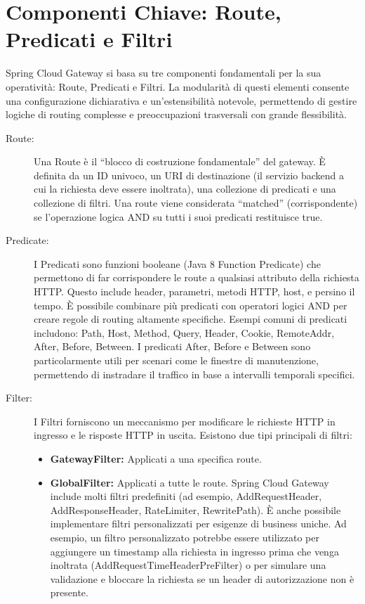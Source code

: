 \section{Componenti Chiave: Route, Predicati e Filtri}

Spring Cloud Gateway si basa su tre componenti fondamentali per la sua operatività: Route, Predicati e Filtri. La modularità di questi elementi consente una configurazione dichiarativa e un'estensibilità notevole, permettendo di gestire logiche di routing complesse e preoccupazioni trasversali con grande flessibilità.
\begin{description}
    \item[Route:] Una Route è il \enquote{blocco di costruzione fondamentale} del gateway. È definita da un ID univoco, un URI di destinazione (il servizio backend a cui la richiesta deve essere inoltrata), una collezione di predicati e una collezione di filtri. Una route viene considerata \enquote{matched} (corrispondente) se l'operazione logica AND su tutti i suoi predicati restituisce true.
    
    \item[Predicate:] I Predicati sono funzioni booleane (Java 8 Function Predicate) che permettono di far corrispondere le route a qualsiasi attributo della richiesta HTTP. Questo include header, parametri, metodi HTTP, host, e persino il tempo. È possibile combinare più predicati con operatori logici AND per creare regole di routing altamente specifiche.
    Esempi comuni di predicati includono: Path, Host, Method, Query, Header, Cookie, RemoteAddr, After, Before, Between. I predicati After, Before e Between sono particolarmente utili per scenari come le finestre di manutenzione, permettendo di instradare il traffico in base a intervalli temporali specifici.
    \item[Filter:] I Filtri forniscono un meccanismo per modificare le richieste HTTP in ingresso e le risposte HTTP in uscita. Esistono due tipi principali di filtri:
    \begin{itemize}
        \item \textbf{GatewayFilter:} Applicati a una specifica route.
        \item \textbf{GlobalFilter:} Applicati a tutte le route. Spring Cloud Gateway include molti filtri predefiniti (ad esempio, AddRequestHeader, AddResponseHeader, RateLimiter, RewritePath). È anche possibile implementare filtri personalizzati per esigenze di business uniche. Ad esempio, un filtro personalizzato potrebbe essere utilizzato per aggiungere un timestamp alla richiesta in ingresso prima che venga inoltrata (AddRequestTimeHeaderPreFilter) o per simulare una validazione e bloccare la richiesta se un header di autorizzazione non è presente.
    \end{itemize}
\end{description}

